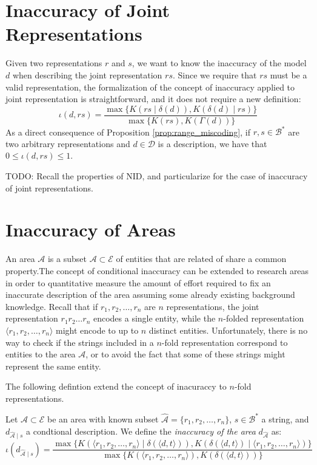\section{Inaccuracy of Joint Representations}

Given two representations $r$ and $s$, we want to know the inaccuracy of the model $d$ when describing the joint representation $rs$. Since we require that $rs$ must be a valid representation, the formalization of the concept of inaccuracy applied to joint representation is straightforward, and it does not require a new definition:
\[
\iota(d, rs) = \frac{ \max\{ K \left(rs \mid \delta(d) \right), K \left( \delta(d) \mid rs \right) \} } { \max\{ K(rs), K \left(\Gamma(d) \right) \} }
\]
As a direct consequence of Proposition \ref{prop:range_miscoding}, if $r, s \in \mathcal{B}^\ast$ are two arbitrary representations and $d \in \mathcal{D}$ is a description, we have that $0 \leq \iota(d, rs) \leq 1$.

{\color{red} TODO: Recall the properties of NID, and particularize for the case of inaccuracy of joint representations.}


%
%

\section{Inaccuracy of Areas}

An area $\mathcal{A}$ is a subset $\mathcal{A} \subset \mathcal{E}$ of entities that are related of share a common property.The concept of conditional inaccuracy can be extended to research areas in order to quantitative measure the amount of effort required to fix an inaccurate description of the area assuming some already existing background knowledge. Recall that if $r_1, r_2, \ldots, r_n$ are $n$ representations, the joint representation $r_1 r_2 \ldots r_n$ encodes a single entity, while the $n$-folded representation $\langle r_1, r_2, \ldots, r_n \rangle$ might encode to up to $n$ distinct entities. Unfortunately, there is no way to check if the strings included in a $n$-fold representation correspond to entities to the area $\mathcal{A}$, or to avoid the fact that some of these strings might represent the same entity.

The following defintion extend the concept of inacuraccy to $n$-fold representations.

\begin{definition}
Let $\mathcal{A} \subset \mathcal{E}$ be an area with known subset $\hat{\mathcal{A}} = \{r_1, r_2, \ldots, r_n\}$, $s \in \mathcal{B}^\ast$ a string, and $d_{\hat{\mathcal{A}} \mid s}$ a condtional description. We define the \emph{inaccuracy of the area} $d_{\hat{\mathcal{A}}}$ as:
\[
\iota(d_{\hat{\mathcal{A}} \mid s}) = \frac{ \max\{ K \left( \langle r_1, r_2, \ldots, r_n \rangle \mid \delta(\langle d, t \rangle) \right), K \left( \delta(\langle d, t \rangle) \mid \langle r_1, r_2, \ldots, r_n \rangle \right) \} } { \max\{ K(\langle r_1, r_2, \ldots, r_n \rangle), K \left(\delta(\langle d, t \rangle) \right) \} }
\]
\end{definition}


